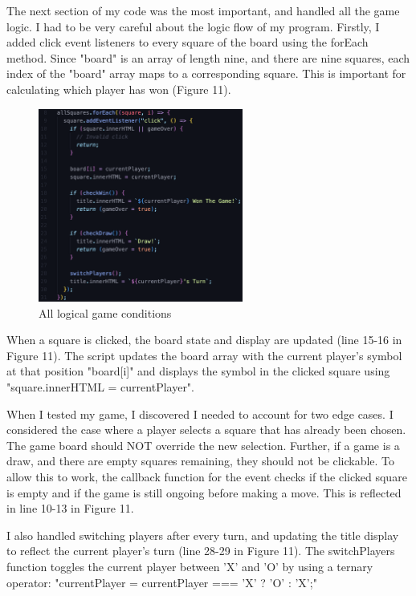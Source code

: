 \documentclass[a4paper, 11pt]{report}
\begin{document}
The next section of my code was the most important, and handled all the game logic. I had to be very careful about the logic flow of my program. Firstly, I added click event listeners to every square of the board using the forEach method. Since "board" is an array of length nine, and there are nine squares, each index of the "board" array maps to a corresponding square. This is important for calculating which player has won (Figure 11).

\begin{figure}[ht]
    \centering
    \includegraphics[width=0.6\textwidth]{Images/ttt3.png}
    \caption{All logical game conditions}
    \label{fig:screenshot}
\end{figure}

When a square is clicked, the board state and display are updated (line 15-16 in Figure 11). The script updates the board array with the current player's symbol at that position "board[i]" and displays the symbol in the clicked square using "square.innerHTML = currentPlayer".

When I tested my game, I discovered I needed to account for two edge cases. I considered the case where a player selects a square that has already been chosen. The game board should NOT override the new selection. Further, if a game is a draw, and there are empty squares remaining, they should not be clickable. To allow this to work, the callback function for the event checks if the clicked square is empty and if the game is still ongoing before making a move. This is reflected in line 10-13 in Figure 11.

I also handled switching players after every turn, and updating the title display to reflect the current player's turn (line 28-29 in Figure 11). The switchPlayers function toggles the current player between 'X' and 'O' by using a ternary operator: "currentPlayer = currentPlayer === 'X' ? 'O' : 'X';"
\end{document}
